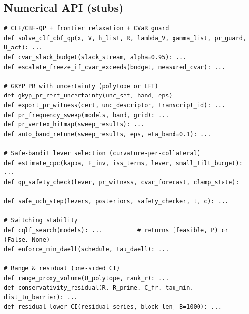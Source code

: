 \documentclass[10pt]{article}
\begin{document}
\subsection*{Numerical API (stubs)}
\begin{lstlisting}
# CLF/CBF-QP + frontier relaxation + CVaR guard
def solve_clf_cbf_qp(x, V, h_list, R, lambda_V, gamma_list, pr_guard, U_act): ...
def cvar_slack_budget(slack_stream, alpha=0.95): ...
def escalate_freeze_if_cvar_exceeds(budget, measured_cvar): ...

# GKYP PR with uncertainty (polytope or LFT)
def gkyp_pr_cert_uncertainty(unc_set, band, eps): ...
def export_pr_witness(cert, unc_descriptor, transcript_id): ...
def pr_frequency_sweep(models, band, grid): ...
def pr_vertex_hitmap(sweep_results): ...
def auto_band_retune(sweep_results, eps, eta_band=0.1): ...

# Safe-bandit lever selection (curvature-per-collateral)
def estimate_cpc(kappa, F_inv, iss_terms, lever, small_tilt_budget): ...
def qp_safety_check(lever, pr_witness, cvar_forecast, clamp_state): ...
def safe_ucb_step(levers, posteriors, safety_checker, t, c): ...

# Switching stability
def cqlf_search(models): ...          # returns (feasible, P) or (False, None)
def enforce_min_dwell(schedule, tau_dwell): ...

# Range & residual (one-sided CI)
def range_proxy_volume(U_polytope, rank_r): ...
def conservativity_residual(R, R_prime, C_fr, tau_min, dist_to_barrier): ...
def residual_lower_CI(residual_series, block_len, B=1000): ...
\end{lstlisting}
\end{document}
